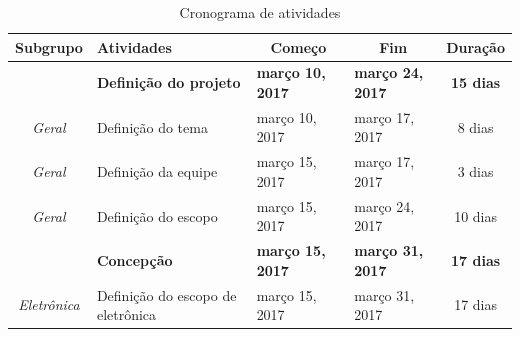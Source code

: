 \footnotesize  %
\setlength\LTleft{-40pt}            %
\setlength\LTright{\fill}           %
\begin{longtable}{|c|m{6.5cm}|m{3.2cm}|m{3.2cm}|c|}
\caption{Cronograma de atividades}
\label{tab:cronograma}
\endfirsthead
\endhead

\hline
\textbf{Subgrupo}                                                         & \textbf{Atividades}                                  & \multicolumn{1}{c|}{\textbf{Começo}} & \multicolumn{1}{c|}{\textbf{Fim}} & \multicolumn{1}{c|}{\textbf{Duração}} \\ \hline
                                                                          & \textbf{Definição do projeto}                        & \textbf{março 10, 2017}              & \textbf{março 24, 2017}           & \textbf{15 dias}                      \\ \hline
\textit{Geral}                                                            & Definição do tema                                    & março 10, 2017                       & março 17, 2017                    & 8 dias                                \\ \hline
\textit{Geral}                                                            & Definição da equipe                                  & março 15, 2017                       & março 17, 2017                    & 3 dias                                \\ \hline
\textit{Geral}                                                            & Definição do escopo                                  & março 15, 2017                       & março 24, 2017                    & 10 dias                               \\ \hline
                                                                          & \textbf{Concepção}                                   & \textbf{março 15, 2017}              & \textbf{março 31, 2017}           & \textbf{17 dias}                      \\ \hline
\textit{Eletrônica}                                                       & Definição do escopo de eletrônica                    & março 15, 2017                       & março 31, 2017                    & 17 dias                               \\ \hline

\end{longtable}
